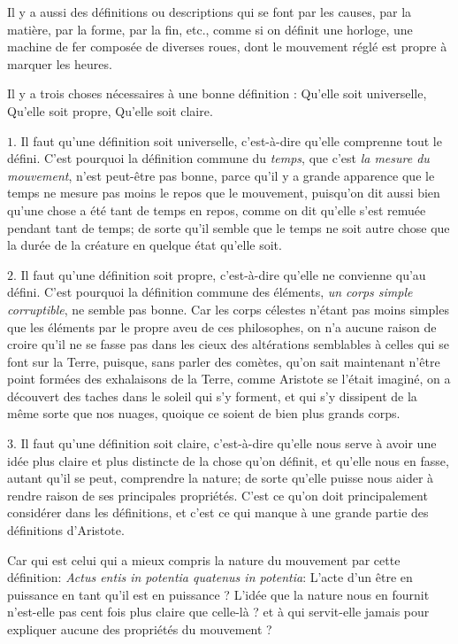 Il y a aussi des définitions ou descriptions qui se font par les causes, par la matière, par la forme, par la fin, etc., comme si on définit une horloge, une machine de fer composée de diverses roues, dont le mouvement réglé est propre à marquer les heures.

Il y a trois choses nécessaires à une bonne définition : Qu'elle soit universelle, Qu'elle soit propre, Qu'elle soit claire.

\bigbreak
$1$. Il faut qu'une définition soit universelle, c'est-à-dire qu'elle comprenne tout le défini. C'est pourquoi la définition commune du \emph{temps}, que c'est \emph{la mesure du mouvement}, n'est peut-être pas bonne, parce qu'il y a grande apparence que le temps ne mesure pas moins le repos que le mouvement, puisqu'on dit aussi bien qu'une chose a été tant de temps en repos, comme on dit qu'elle s'est remuée pendant tant de temps; de sorte qu'il semble que le temps ne soit autre chose que la durée de la créature en quelque état qu'elle soit.

\bigbreak
$2$. Il faut qu'une définition soit propre, c'est-à-dire qu'elle ne convienne qu'au défini. C'est pourquoi la définition commune des éléments, \emph{un corps simple corruptible}, ne semble pas bonne. Car les corps célestes n'étant pas moins simples que les éléments par le propre aveu de ces philosophes, on n'a aucune raison de croire qu'il ne se fasse pas dans les cieux des altérations semblables à celles qui se font sur la Terre, puisque, sans parler des comètes, qu'on sait maintenant n'être point formées des exhalaisons de la Terre, comme Aristote se l'était imaginé, on a découvert des taches dans le soleil qui s'y forment, et qui s'y dissipent de la même sorte que nos nuages, quoique ce soient de bien plus grands corps.

\bigbreak
$3$. Il faut qu'une définition soit claire, c'est-à-dire qu'elle nous serve à avoir une idée plus claire et plus distincte de la chose qu'on définit, et qu'elle nous en fasse, autant qu'il se peut, comprendre la nature; de sorte qu'elle puisse nous aider à rendre raison de ses principales propriétés. C'est ce qu'on doit principalement considérer dans les définitions, et c'est ce qui manque à une grande partie des définitions d'Aristote.

Car qui est celui qui a mieux compris la nature du mouvement par cette définition: \emph{Actus entis in potentia quatenus in potentia}: L'acte d'un être en puissance en tant qu'il est en puissance ? L'idée que la nature nous en fournit n'est-elle pas cent fois plus claire que celle-là ? et à qui servit-elle jamais pour expliquer aucune des propriétés du mouvement ?

